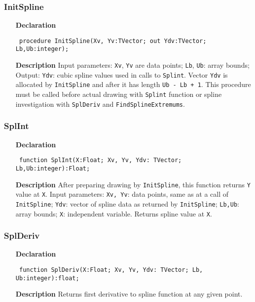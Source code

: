 \documentclass[12pt,a4paper,oneside]{report}
\newcommand{\declarationitem}[1]{\textbf{#1}}
\newcommand{\descriptiontitle}[1]{\textbf{#1}}
\newcommand{\code}[1]{\texttt{#1}}
\begin{document}
\subsubsection{InitSpline}
\label{uSpline-InitSpline}
\begin{itemize}\item[\declarationitem{Declaration}\hfill]
	\begin{flushleft}
		\code{
			procedure InitSpline(Xv, Yv:TVector; out Ydv:TVector; Lb,Ub:integer);}
		
	\end{flushleft}
	
	\par
	\item[\descriptiontitle{Description}]
	Input parameters: \code{Xv}, \code{Yv} are data points; \code{Lb}, \code{Ub}:  array bounds; Output: \code{Ydv}: cubic spline values used in calls to \code{Splint}. Vector \code{Ydv} is allocated by \code{InitSpline} and after it has length \code{Ub - Lb + 1}.  This procedure must be called before actual drawing with \code{Splint} function or spline investigation with \code{SplDeriv} and \code{FindSplineExtremums}.
\end{itemize}
\subsubsection{SplInt}
\label{uSpline-SplInt}
\begin{itemize}\item[\declarationitem{Declaration}\hfill]
	\begin{flushleft}
		\code{
			function SplInt(X:Float; Xv, Yv, Ydv: TVector; Lb,Ub:integer):Float;}
	\end{flushleft}
	\par
	\item[\descriptiontitle{Description}]
	After preparing drawing by \code{InitSpline}, this function returns \code{Y} value at \code{X}. Input parameters: \code{Xv, Yv}: data points, same as at a call of \code{InitSpline}; \code{Ydv}: vector of spline data as returned by \code{InitSpline}; \code{Lb,Ub}: array bounds; \code{X}: independent variable. Returns spline value at \code{X}.
	
\end{itemize}
\subsubsection{SplDeriv}
\label{uSpline-SplDeriv}
\begin{itemize}\item[\declarationitem{Declaration}\hfill]
	\begin{flushleft}
		\code{
			function SplDeriv(X:Float; Xv, Yv, Ydv: TVector; Lb, Ub:integer):float;}
		
	\end{flushleft}
	
	\par
	\item[\descriptiontitle{Description}]
	Returns first derivative to spline function at any given point.
	
\end{itemize}
\end{document}
